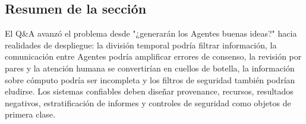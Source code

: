 \subsection{Resumen de la sección}

El Q\&A avanzó el problema desde "¿generarán los Agentes buenas ideas?" hacia realidades de despliegue: la división temporal podría filtrar información, la comunicación entre Agentes podría amplificar errores de consenso, la revisión por pares y la atención humana se convertirían en cuellos de botella, la información sobre cómputo podría ser incompleta y los filtros de seguridad también podrían eludirse. Los sistemas confiables deben diseñar provenance, recursos, resultados negativos, estratificación de informes y controles de seguridad como objetos de primera clase.
